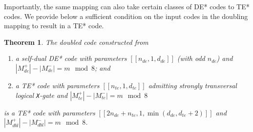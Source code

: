 \documentclass[journal]{IEEEtran}
\newcommand{\X}{\texttt{X}}
\newtheorem{theorem}{Theorem}[section]
\begin{document}
Importantly, the same mapping can also take certain classes of DE* codes to TE* codes. We provide below a sufficient condition on the input codes in the doubling mapping to result in a TE* code.

\begin{theorem}\label{thm:dbling_te}
    The doubled code constructed from 
    \begin{enumerate}
        \item a self-dual DE* code with parameters $[[n_{de},1,d_{de}]]$ (with odd $n_{de}$) and $|M_{de}^+|-|M_{de}^-|=m \mod{8}$; and
        \item a TE* code with parameters $[[n_{te},1,d_{te}]]$ admitting strongly transversal logical \X-gate and $|M_{te}^+|-|M_{te}^-|=m \mod{8}$
    \end{enumerate}  
    is a TE* code with parameters $[[2n_{de}+n_{te},1,\min(d_{de},d_{te}+2)]]$ and $|M_{dbl}^+|-|M_{dbl}^-|=m \mod{8}$.
\end{theorem}
\end{document}
